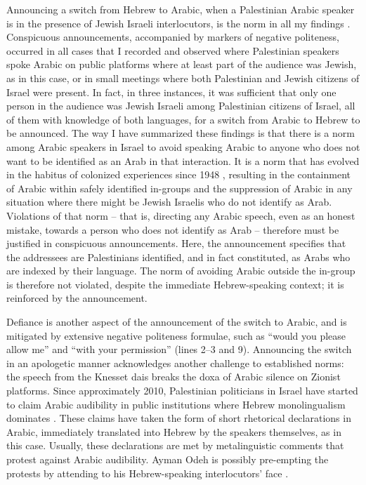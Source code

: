 \documentclass[output=paper,arabicfont]{langscibook}
\begin{document}
Announcing a switch from Hebrew to Arabic, when a Palestinian Arabic speak\-er is in the presence of Jewish Israeli interlocutors, is the norm in all my findings \citep[63–87]{hawker2019a}. Conspicuous announcements, accompanied by markers of negative politeness, occurred in all cases that I recorded and observed where Palestinian speakers spoke Arabic on public platforms where at least part of the audience was Jewish, as in this case, or in small meetings where both Palestinian and Jewish citizens of Israel were present. In fact, in three instances, it was sufficient that only one person in the audience was Jewish Israeli among Palestinian citizens of Israel, all of them with knowledge of both languages, for a switch from Arabic to Hebrew to be announced. The way I have summarized these findings is that there is a norm among Arabic speakers in Israel to avoid speaking Arabic to anyone who does not want to be identified as an Arab in that interaction. It is a norm that has evolved in the habitus of colonized experiences since 1948 \citep{papp2011a}, resulting in the containment of Arabic within safely identified in-groups and the suppression of Arabic in any situation where there might be Jewish Israelis who do not identify as Arab. Violations of that norm – that is, directing any Arabic speech, even as an honest mistake, towards a person who does not identify as Arab – therefore must be justified in conspicuous announcements. Here, the announcement specifies that the addressees are Palestinians identified, and in fact constituted, as Arabs who are indexed by their language. The norm of avoiding Arabic outside the in-group is therefore not violated, despite the immediate Hebrew-speaking context; it is reinforced by the announcement.

Defiance is another aspect of the announcement of the switch to Arabic, and is mitigated by extensive negative politeness formulae, such as “would you please allow me” and “with your permission” (lines 2–3 and 9). Announcing the switch in an apologetic manner acknowledges another challenge to established norms: the speech from the Knesset dais breaks the doxa of Arabic silence on Zionist platforms. Since approximately 2010, Palestinian politicians in Israel have started to claim Arabic audibility in public institutions where Hebrew monolingualism dominates \citep[37–52]{hawker2019a}. These claims have taken the form of short rhetorical declarations in Arabic, immediately translated into Hebrew by the speakers themselves, as in this case. Usually, these declarations are met by metalinguistic comments that protest against Arabic audibility. Ayman Odeh is possibly pre-empting the protests by attending to his Hebrew-speaking interlocutors’ face \citep{eelen2001a}. 
\end{document}
